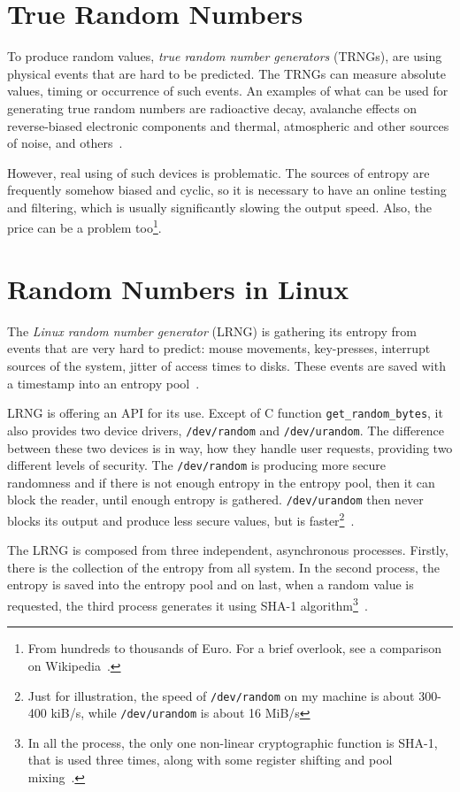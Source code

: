 \section{True Random Numbers}
To produce random values, {\em true random number generators} (TRNGs), are using physical events that are hard to be predicted. The TRNGs can measure absolute values, timing or occurrence of such events.
An examples of what can be used for generating true random numbers are radioactive decay, avalanche effects on reverse-biased electronic components and thermal, atmospheric and other sources of noise, and others~\cite[p.~6]{AnalysisOfEntropyLevels}.

However, real using of such devices is problematic. The sources of entropy are frequently somehow biased and cyclic, so it is necessary to have an online testing and filtering, which is usually significantly slowing the output speed. Also, the price can be a problem too\footnote{From hundreds to thousands of Euro. For a brief overlook, see a comparison on Wikipedia~\cite{HWRNGComparison}. }.


\section{Random Numbers in Linux}\label{sec:randomNumbers:linux}
The {\em Linux random number generator} (LRNG) is gathering its entropy from events that are very hard to predict: mouse movements, key-presses, interrupt sources of the system, jitter of access times to disks. These events are saved with a timestamp into an entropy pool~\cite{AnalysisOfLinuxRNG}.

LRNG is offering an API for its use. Except of C function {\tt get\_random\_bytes}, it also provides two device drivers, {\tt /dev/random} and {\tt /dev/urandom}. The difference between these two devices is in way, how they handle user requests, providing two different levels of security. The {\tt /dev/random} is producing more secure randomness and if there is not enough entropy in the entropy pool, then it can block the reader, until enough entropy is gathered. {\tt /dev/urandom} then never blocks its output and produce less secure values, but is faster\footnote{Just for illustration, the speed of {\tt /dev/random} on my machine is about 300-400 kiB/s, while {\tt /dev/urandom} is about 16 MiB/s}~\cite[chapter~1]{AnalysisOfLinuxRNG}. 

The LRNG is composed from three independent, asynchronous processes. Firstly, there is the collection of the entropy from all system. In the second process, the entropy is saved into the entropy pool and on last, when a random value is requested, the third process generates it using SHA-1 algorithm\footnote{In all the process, the only one non-linear cryptographic function is SHA-1, that is used three times, along with some register shifting and pool mixing~\cite[section~2.6]{AnalysisOfLinuxRNG}.}~\cite[chapter~2]{AnalysisOfLinuxRNG}.

